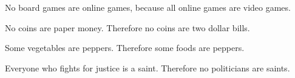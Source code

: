 \begin{exercises}
\item No board games are online games, because all online games are video games.


\item No coins are paper money. Therefore no coins are two dollar bills.


\item Some vegetables are peppers. Therefore some foods are peppers.



\item Everyone who fights for justice is a saint. Therefore no politicians are saints.
%


\end{exercises}
